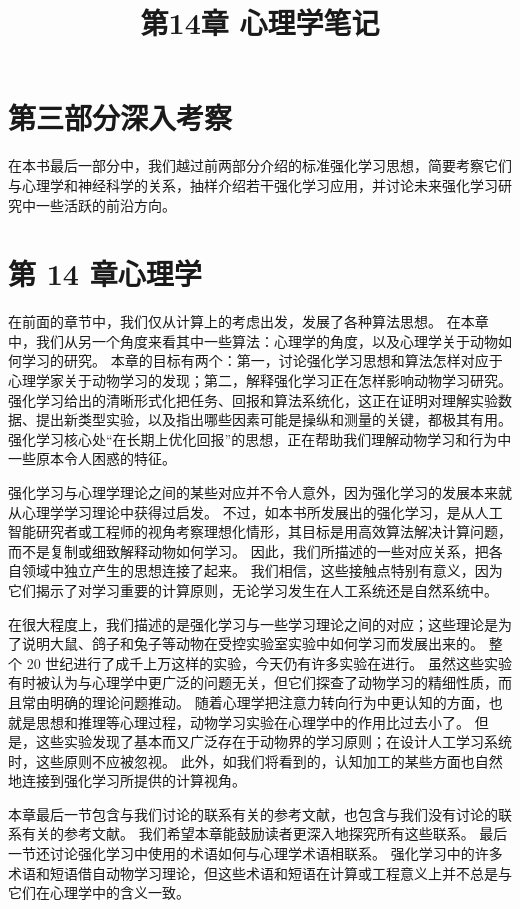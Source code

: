 \documentclass[UTF8,12pt,a4paper,fontset=fandol]{ctexart}
\title{第14章 心理学笔记}
\author{}
\date{}
\begin{document}
\maketitle

\section*{第三部分\quad 深入考察}

在本书最后一部分中，我们越过前两部分介绍的标准强化学习思想，简要考察它们与心理学和神经科学的关系，抽样介绍若干强化学习应用，并讨论未来强化学习研究中一些活跃的前沿方向。

\section*{第 14 章\quad 心理学}

在前面的章节中，我们仅从计算上的考虑出发，发展了各种算法思想。
在本章中，我们从另一个角度来看其中一些算法：心理学的角度，以及心理学关于动物如何学习的研究。
本章的目标有两个：第一，讨论强化学习思想和算法怎样对应于心理学家关于动物学习的发现；第二，解释强化学习正在怎样影响动物学习研究。
强化学习给出的清晰形式化把任务、回报和算法系统化，这正在证明对理解实验数据、提出新类型实验，以及指出哪些因素可能是操纵和测量的关键，都极其有用。
强化学习核心处“在长期上优化回报”的思想，正在帮助我们理解动物学习和行为中一些原本令人困惑的特征。

强化学习与心理学理论之间的某些对应并不令人意外，因为强化学习的发展本来就从心理学学习理论中获得过启发。
不过，如本书所发展出的强化学习，是从人工智能研究者或工程师的视角考察理想化情形，其目标是用高效算法解决计算问题，而不是复制或细致解释动物如何学习。
因此，我们所描述的一些对应关系，把各自领域中独立产生的思想连接了起来。
我们相信，这些接触点特别有意义，因为它们揭示了对学习重要的计算原则，无论学习发生在人工系统还是自然系统中。

在很大程度上，我们描述的是强化学习与一些学习理论之间的对应；这些理论是为了说明大鼠、鸽子和兔子等动物在受控实验室实验中如何学习而发展出来的。
整个 20 世纪进行了成千上万这样的实验，今天仍有许多实验在进行。
虽然这些实验有时被认为与心理学中更广泛的问题无关，但它们探查了动物学习的精细性质，而且常由明确的理论问题推动。
随着心理学把注意力转向行为中更认知的方面，也就是思想和推理等心理过程，动物学习实验在心理学中的作用比过去小了。
但是，这些实验发现了基本而又广泛存在于动物界的学习原则；在设计人工学习系统时，这些原则不应被忽视。
此外，如我们将看到的，认知加工的某些方面也自然地连接到强化学习所提供的计算视角。

本章最后一节包含与我们讨论的联系有关的参考文献，也包含与我们没有讨论的联系有关的参考文献。
我们希望本章能鼓励读者更深入地探究所有这些联系。
最后一节还讨论强化学习中使用的术语如何与心理学术语相联系。
强化学习中的许多术语和短语借自动物学习理论，但这些术语和短语在计算或工程意义上并不总是与它们在心理学中的含义一致。
\end{document}
